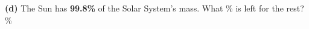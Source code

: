 \documentclass[12pt,a4paper]{article}
\newif\iffr
\newcommand{\fr}[1]{\unskip\iffr\par\vspace{1pt}\noindent{\small\itshape\color{black!60}#1}\par\fi}
\newcommand{\frl}[2]{\iffr#2\else#1\fi}
\begin{document}
\vspace{\frl{3pt}{6pt}}
\noindent\begin{minipage}{\textwidth}
\textbf{(d)} The Sun has \textbf{99.8\%} of the Solar System's mass. What \% is
left for the rest? \hfill \blank[1.8cm]\,\%
\fr{(d) Le Soleil a 99.8\,\% de la masse du syst\`eme solaire. Quel pourcentage
reste-t-il pour tout le reste~? (Le tout fait 100\,\%.)}
\end{minipage}


\end{document}
